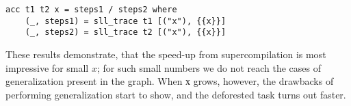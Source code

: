 \begin{lstlisting}[style=demo]
acc t1 t2 x = steps1 / steps2 where
	(_, steps1) = sll_trace t1 [("x"), {{x}}]
	(_, steps2) = sll_trace t2 [("x"), {{x}}]
\end{lstlisting}



These results demonstrate, that the speed-up from supercompilation is most impressive
for small $x$;
for such small numbers we do not reach the cases of generalization present in the graph.
When $х$ grows, however, the drawbacks of performing generalization start to show,
and the deforested task turns out faster.

